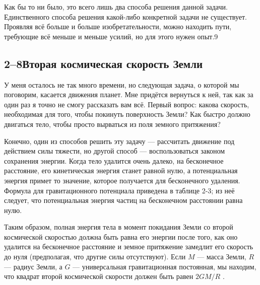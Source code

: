 \documentclass[11pt,oneside]{article}
\begin{document}
Как бы то ни было, это всего лишь два способа решения данной задачи. Единственного способа решения какой-либо конкретной задачи не существует. Проявляя всё больше и больше изобретательности, можно находить пути, требующие всё меньше и меньше усилий, но для этого нужен опыт.9\par

\subsection*{2--8Вторая космическая скорость Земли}

У меня осталось не так много времени, но следующая задача, о которой мы поговорим, касается движения планет. Мне придётся вернуться к ней, так как за один раз я точно не смогу рассказать вам всё. Первый вопрос: какова скорость, необходимая для того, чтобы покинуть поверхность Земли? Как быстро должно двигаться тело, чтобы просто вырваться из поля земного притяжения?\par

Конечно, один из способов решить эту задачу --- рассчитать движение под действием силы тяжести, но другой способ --- воспользоваться законом сохранения энергии. Когда тело удалится очень далеко, на бесконечное расстояние, его кинетическая энергия станет равной нулю, а потенциальная энергия примет то значение, которое получается для бесконечного удаления. Формула для гравитационного потенциала приведена в таблице 2-3; из неё следует, что потенциальная энергия частиц на бесконечном расстоянии равна нулю.\par

Таким образом, полная энергия тела в момент покидания Земли со второй космической скоростью должна быть равна его энергии после того, как оно удалится на бесконечное расстояние и земное притяжение замедлит его скорость до нуля (предполагая, что другие силы отсутствуют). Если \(M\) --- масса Земли, \(R\) --- радиус Земли, а \(G\) --- универсальная гравитационная постоянная, мы находим, что квадрат второй космической скорости должен быть равен \(2GM/R\) .\par
\end{document}

